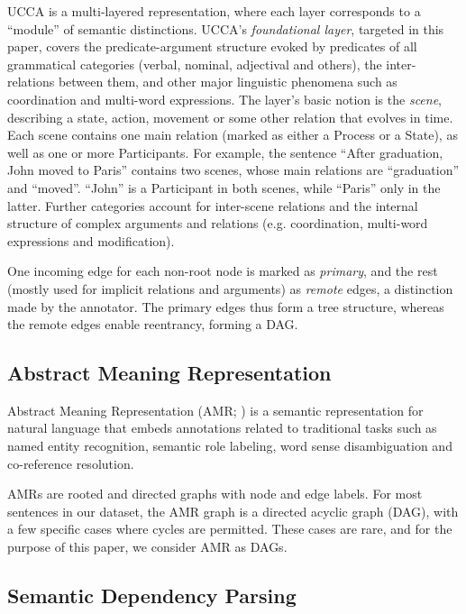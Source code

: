 \documentclass[11pt,a4paper]{article}
\begin{document}
UCCA is a multi-layered representation, where each layer corresponds
to a ``module'' of semantic distinctions.
UCCA's \textit{foundational layer}, targeted in this paper, covers the predicate-argument
structure evoked by predicates of all grammatical categories
(verbal, nominal, adjectival and others), the inter-relations between them,
and other major linguistic phenomena such as coordination and multi-word expressions.
The layer's basic notion is the \textit{scene},
describing a state, action, movement or some other relation that evolves in time.
Each scene contains one main relation (marked as either a Process or a State),
as well as one or more Participants.
For example, the sentence ``After graduation, John moved to Paris''
contains two scenes, whose main relations are ``graduation'' and ``moved''.
``John'' is a Participant in both scenes, while ``Paris'' only in the latter.
Further categories account for inter-scene relations and the internal structure of
complex arguments and relations (e.g. coordination, multi-word expressions and modification).

One incoming edge for each non-root node is marked as \textit{primary},
and the rest (mostly used for implicit relations and arguments) as \textit{remote} edges,
a distinction made by the annotator.
The primary edges thus form a tree structure, whereas the remote edges enable reentrancy,
forming a DAG.

\subsection{Abstract Meaning Representation}\label{sec:amr}

Abstract Meaning Representation (AMR; \citet{banarescu2013abstract})
is a semantic representation for natural
language that embeds annotations related
to traditional tasks such as named entity
recognition, semantic role labeling, word
sense disambiguation and co-reference
resolution.

AMRs are rooted and directed
graphs with node and edge labels.
For most sentences in our dataset, the
AMR graph is a directed acyclic graph (DAG),
with a few specific cases where cycles are permitted.
These cases are rare, and for the purpose of
this paper, we consider AMR as DAGs.

\subsection{Semantic Dependency Parsing}\label{sec:sdp}
\end{document}
